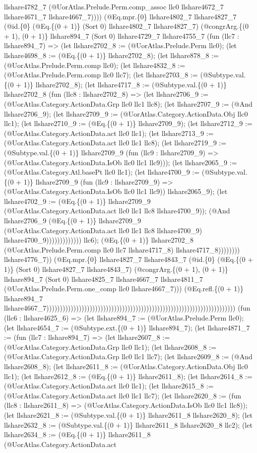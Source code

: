 \documentclass[11pt]{article}
\begin{document}
llshare4782\_7 (@UorAtlas.Prelude.Perm.comp\_assoc llc0 llshare4672\_7 llshare4671\_7 llshare4667\_7)))) (@Eq.mpr.\{0\} llshare4802\_7 llshare4827\_7 (@id.\{0\} (@Eq.\{(0 + 1)\} (Sort 0) llshare4802\_7 llshare4827\_7) (@congrArg.\{(0 + 1), (0 + 1)\} llshare894\_7 (Sort 0) llshare4729\_7 llshare4755\_7 (fun (llc7 : llshare894\_7) => (let llshare2702\_8 := (@UorAtlas.Prelude.Perm llc0); (let llshare4698\_8 := (@Eq.\{(0 + 1)\} llshare2702\_8); (let llshare878\_8 := (@UorAtlas.Prelude.Perm.comp llc0); (let llshare4832\_8 := (@UorAtlas.Prelude.Perm.comp llc0 llc7); (let llshare2703\_8 := (@Subtype.val.\{(0 + 1)\} llshare2702\_8); (let llshare4717\_8 := (@Subtype.val.\{(0 + 1)\} llshare2702\_8 (fun (llc8 : llshare2702\_8) => (let llshare2706\_9 := (@UorAtlas.Category.ActionData.Grp llc0 llc1 llc8); (let llshare2707\_9 := (@And llshare2706\_9); (let llshare2709\_9 := (@UorAtlas.Category.ActionData.Obj llc0 llc1); (let llshare2710\_9 := (@Eq.\{(0 + 1)\} llshare2709\_9); (let llshare2712\_9 := (@UorAtlas.Category.ActionData.act llc0 llc1); (let llshare2713\_9 := (@UorAtlas.Category.ActionData.act llc0 llc1 llc8); (let llshare2719\_9 := (@Subtype.val.\{(0 + 1)\} llshare2709\_9 (fun (llc9 : llshare2709\_9) => (@UorAtlas.Category.ActionData.IsOb llc0 llc1 llc9))); (let llshare2065\_9 := (@UorAtlas.Category.Atl.basePt llc0 llc1); (let llshare4700\_9 := (@Subtype.val.\{(0 + 1)\} llshare2709\_9 (fun (llc9 : llshare2709\_9) => (@UorAtlas.Category.ActionData.IsOb llc0 llc1 llc9)) llshare2065\_9); (let llshare4702\_9 := (@Eq.\{(0 + 1)\} llshare2709\_9 (@UorAtlas.Category.ActionData.act llc0 llc1 llc8 llshare4700\_9)); (@And llshare2706\_9 (@Eq.\{(0 + 1)\} llshare2709\_9 (@UorAtlas.Category.ActionData.act llc0 llc1 llc8 llshare4700\_9) llshare4700\_9))))))))))))) llc6); (@Eq.\{(0 + 1)\} llshare2702\_8 (@UorAtlas.Prelude.Perm.comp llc0 llc7 llshare4717\_8) llshare4717\_8)))))))) llshare4776\_7)) (@Eq.mpr.\{0\} llshare4827\_7 llshare4843\_7 (@id.\{0\} (@Eq.\{(0 + 1)\} (Sort 0) llshare4827\_7 llshare4843\_7) (@congrArg.\{(0 + 1), (0 + 1)\} llshare894\_7 (Sort 0) llshare4825\_7 llshare4667\_7 llshare4811\_7 (@UorAtlas.Prelude.Perm.one\_comp llc0 llshare4667\_7))) (@Eq.refl.\{(0 + 1)\} llshare894\_7 llshare4667\_7)))))))))))))))))))))))))))))))))))))))))))))))))))))))))))))))))))))) (fun (llc6 : llshare4625\_6) => (let llshare894\_7 := (@UorAtlas.Prelude.Perm llc0); (let llshare4654\_7 := (@Subtype.ext.\{(0 + 1)\} llshare894\_7); (let llshare4871\_7 := (fun (llc7 : llshare894\_7) => (let llshare2607\_8 := (@UorAtlas.Category.ActionData.Grp llc0 llc1); (let llshare2608\_8 := (@UorAtlas.Category.ActionData.Grp llc0 llc1 llc7); (let llshare2609\_8 := (@And llshare2608\_8); (let llshare2611\_8 := (@UorAtlas.Category.ActionData.Obj llc0 llc1); (let llshare2612\_8 := (@Eq.\{(0 + 1)\} llshare2611\_8); (let llshare2614\_8 := (@UorAtlas.Category.ActionData.act llc0 llc1); (let llshare2615\_8 := (@UorAtlas.Category.ActionData.act llc0 llc1 llc7); (let llshare2620\_8 := (fun (llc8 : llshare2611\_8) => (@UorAtlas.Category.ActionData.IsOb llc0 llc1 llc8)); (let llshare2621\_8 := (@Subtype.val.\{(0 + 1)\} llshare2611\_8 llshare2620\_8); (let llshare2632\_8 := (@Subtype.val.\{(0 + 1)\} llshare2611\_8 llshare2620\_8 llc2); (let llshare2634\_8 := (@Eq.\{(0 + 1)\} llshare2611\_8 (@UorAtlas.Category.ActionData.act 
\end{document}
